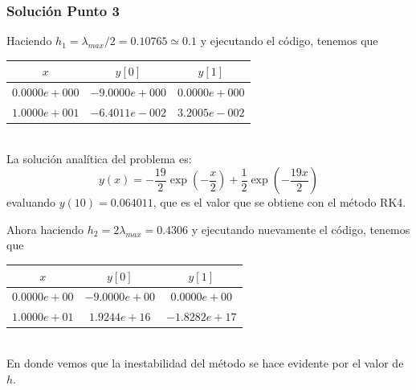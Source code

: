 \begin{frame}
\frametitle{Solución Punto 3}
Haciendo $h_{1} = \lambda_{max}/2 = 0.10765 \simeq 0.1$ y ejecutando el código, tenemos que
\begin{tabular}{c | c | c}
$x$ & $y[0]$ & $y[1]$ \\ \hline
$0.0000e+000$ & $-9.0000e+000$ & $0.0000e+000$ \\ \hline
$1.0000e+001$ & $-6.4011e-002$ & $3.2005e-002$ \\ \hline
\end{tabular}
\\
\medskip
La solución analítica del problema es:
\[ y(x) = -\dfrac{19}{2} \exp \left( - \frac{x}{2} \right) + \dfrac{1}{2} \exp \left(- \frac{19x}{2} \right) \]
evaluando $y(10)= 0.064011$, que es el valor que se obtiene con el método RK4.
\end{frame}
\begin{frame}
Ahora haciendo $h_{2} = 2 \lambda_{max} = 0.4306$ y ejecutando nuevamente el código, tenemos que
\begin{tabular}{c | c | c}
$x$ & $y[0]$ & $y[1]$ \\ \hline
$0.0000e+00$ & $-9.0000e+00$ & $0.0000e+00$ \\ \hline
$1.0000e+01$ & $1.9244e+16$ & $-1.8282e+17$ \\ \hline
\end{tabular}
\\
\medskip
En donde vemos que la inestabilidad del método se hace evidente por el valor de $h$.
\end{frame}
